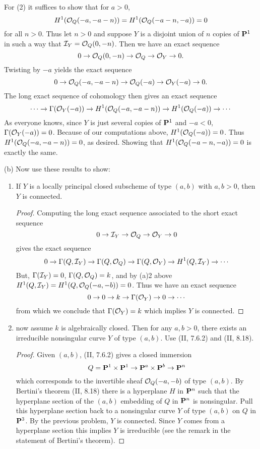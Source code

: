 \documentclass[12pt]{article}
\begin{document}
\begin{exercise}
For (2) it suffices to show that for $a>0$, 
$$H^1(\soq(-a,-a-n))=H^1(\soq(-a-n,-a))=0$$
for all $n>0$. Thus let $n>0$ and suppose $Y$ is a disjoint union
of $n$ copies of $\P^1$ in such a way that $\sI_Y=\soq(0,-n)$. 
Then we have an exact sequence
$$0\into\soq(0,-n)\into\soq\into\sO_Y\into 0.$$
Twisting by $-a$ yields the exact sequence
$$0\into\soq(-a,-a-n)\into\soq(-a)\into\sO_Y(-a)\into 0.$$
The long exact sequence of cohomology then gives an exact sequence
$$\cdots \into\Gamma(\sO_Y(-a))\into H^1(\soq(-a,-a-n))
\into H^1(\soq(-a))\into \cdots$$
As everyone knows, since $Y$ is just several copies of $\P^1$ and $-a<0$,
$\Gamma(\sO_Y(-a))=0$. Because of our computations above,
$H^1(\soq(-a))=0$. Thus $H^1(\soq(-a,-a-n))=0$, as desired. 
Showing that $H^1(\soq(-a-n,-a))=0$ is exactly the same. 

\noindent (b) Now use these results to show:
\begin{enumerate}
\item If $Y$ is a locally principal closed subscheme of
type $(a,b)$ with $a,b>0$, then $Y$ is connected.
\begin{proof}
Computing the long exact sequence associated to the short
exact sequence
$$0\into\sI_Y\into\soq\into\sO_Y\into{}0$$
gives the exact sequence
$$0\into\Gamma(Q,\sI_Y)\into\Gamma(Q,\soq)\into\Gamma(Q,\sO_Y)
\into H^1(Q,\sI_Y)\into\cdots$$
But, $\Gamma(\sI_Y)=0$, $\Gamma(Q,\soq)=k$, and
by (a)2 above $H^1(Q,\sI_Y)=H^1(Q,\soq(-a,-b))=0$. Thus we
have an exact sequence
$$0\into{}0\into{}k\into\Gamma(\so_Y)\into{}0\into\cdots$$
from which we conclude that $\Gamma(\so_Y)=k$ which implies
$Y$ is connected.  
\end{proof}

\item now assume $k$ is algebraically closed. Then for any
$a,b>0$, there exists an irreducible nonsingular curve
$Y$ of type $(a,b)$. Use (II, 7.6.2) and (II, 8.18).
\begin{proof}
Given $(a,b)$, (II, 7.6.2) gives a closed immersion
$$Q=\P^1\times\P^1\into\P^a\times\P^b\into\P^n$$
which corresponds to the invertible sheaf $\soq(-a,-b)$
of type $(a,b)$. By Bertini's theorem (II, 8.18) there
is a hyperplane $H$ in $\P^n$ such that the hyperplane section
of the $(a,b)$ embedding of $Q$ in $\P^n$ is nonsingular. 
Pull this hyperplane section back to a nonsingular curve $Y$ of
type $(a,b)$ on $Q$ in $\P^3$. By the previous problem, $Y$ is
connected. Since $Y$ comes from a hyperplane section this implies
$Y$ is irreducible (see the remark in the statement of Bertini's
theorem).  
\end{proof}


\end{enumerate}
\end{exercise}
\end{document}
